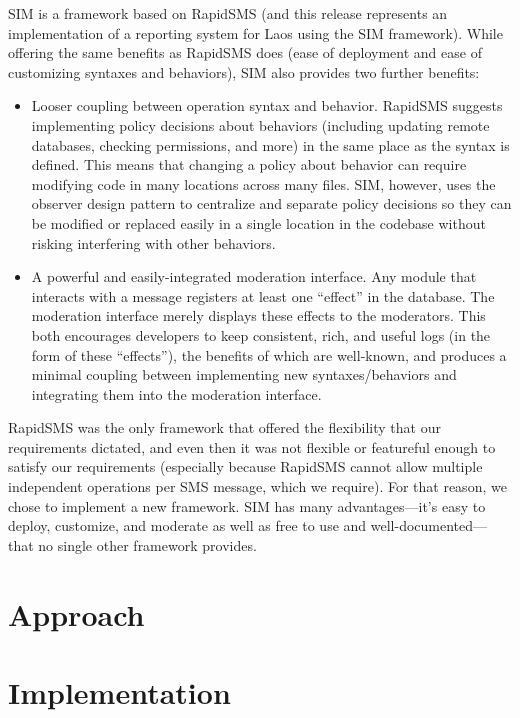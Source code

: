 \documentclass{acm_proc_article-sp}
\begin{document}
SIM is a framework based on RapidSMS (and this release represents an implementation of a reporting system for Laos using the SIM framework). While offering the same benefits as RapidSMS does (ease of deployment and ease of customizing syntaxes and behaviors), SIM also provides two further benefits: 

\begin{itemize}
\item Looser coupling between operation syntax and behavior. RapidSMS suggests implementing policy decisions about behaviors (including updating remote databases, checking permissions, and more) in the same place as the syntax is defined. This means that changing a policy about behavior can require modifying code in many locations across many files. SIM, however, uses the observer design pattern to centralize and separate policy decisions so they can be modified or replaced easily in a single location in the codebase without risking interfering with other behaviors.
\item A powerful and easily-integrated moderation interface. Any module that interacts with a message registers at least one ``effect'' in the database. The moderation interface merely displays these effects to the moderators. This both encourages developers to keep consistent, rich, and useful logs (in the form of these ``effects''), the benefits of which are well-known, and produces a minimal coupling between implementing new syntaxes/behaviors and integrating them into the moderation interface.
\end{itemize}

RapidSMS was the only framework that offered the flexibility that our requirements dictated, and even then it was not flexible or featureful enough to satisfy our requirements (especially because RapidSMS cannot allow multiple independent operations per SMS message, which we require). For that reason, we chose to implement a new framework. SIM has many advantages---it's easy to deploy, customize, and moderate as well as free to use and well-documented---that no single other framework provides.

\section{Approach}

\section{Implementation}
\end{document}
